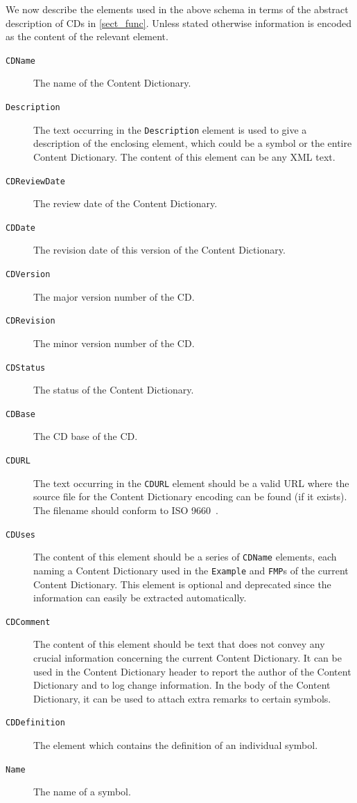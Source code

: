 \documentclass{report}
\def\XML{XML\xspace}
\begin{document}
We now describe the elements used in the above schema in terms of the abstract description
of CDs in \ref{sect_func}.  Unless stated otherwise information is encoded as the content
of the relevant element.

\begin{description}
\item[\lstinline|CDName|] The name of the Content Dictionary.
\item[\lstinline|Description|] The text occurring in the \lstinline|Description| element
  is used to give a description of the enclosing element, which could be a symbol or the
  entire Content Dictionary. The content of this element can be any \XML text.
\item[\lstinline|CDReviewDate|] The review date of the Content Dictionary.
\item[\lstinline|CDDate|] The revision date of this version of the Content Dictionary.
\item[\lstinline|CDVersion|] The major version number of the CD.
\item[\lstinline|CDRevision|] The minor version number of the CD.
\item[\lstinline|CDStatus|] The status of the Content Dictionary.
\item[\lstinline|CDBase|] The CD base of the CD.
\item[\lstinline|CDURL|] The text occurring in the \lstinline|CDURL| element should be a
  valid URL where the source file for the Content Dictionary encoding can be found (if it
  exists). The filename should conform to ISO 9660~\cite{iso9660}.
\item[\lstinline|CDUses|] The content of this element should be a series of
  \lstinline|CDName| elements, each naming a Content Dictionary used in the
  \lstinline|Example| and \lstinline|FMP|s of the current Content Dictionary. This
  element is optional and deprecated since the information can easily be extracted
  automatically.
\item[\lstinline|CDComment|] The content of this element should be text that does not
  convey any crucial information concerning the current Content Dictionary. It can be used
  in the Content Dictionary header to report the author of the Content Dictionary and to
  log change information. In the body of the Content Dictionary, it can be used to attach
  extra remarks to certain symbols.
\item[\lstinline|CDDefinition|] The element which contains the definition of an
  individual symbol.
\item[\lstinline|Name|]The name of a symbol.

\end{description}
\end{document}
